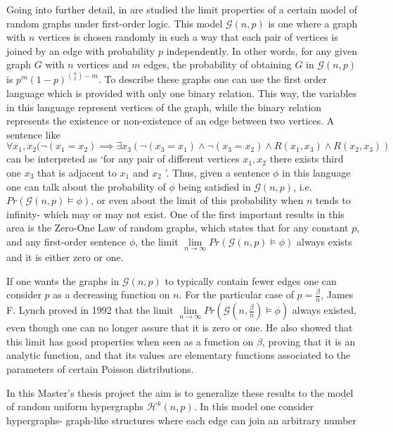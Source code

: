 \documentclass{article}
\begin{document}
Going into further detail, in \cite{lynch1992probabilities} are studied the limit properties of a certain model
of random graphs under first-order logic. This model $\mathcal{G}(n,p)$ is one where a graph with $n$ vertices is chosen
randomly in such a way that each pair of vertices is joined by an edge with probability $p$ independently. In other 
words, for any given graph $G$ with $n$ vertices and $m$ edges, the probability of obtaining $G$ in $\mathcal{G}(n,p)$
is $p^m(1-p)^{\binom{n}{2} - m}$. To describe these graphs one can use the first order language which is provided with 
only one binary relation. This way, the variables in this language represent vertices of the graph, while the binary relation 
represents the existence or non-existence of an edge between two vertices. A sentence like $\forall x_1, x_2 (\lnot(x_1=x_2)\implies \exists x_3 (\lnot(x_3=x_1) \wedge \lnot(x_3=x_2)\wedge R(x_1,x_3) \wedge R(x_2,x_3))$ can be interpreted as `for any pair of different vertices $x_1, x_2$ there exists third one $x_3$ that is adjacent to $x_1$ and $x_2$ '. Thus, given a sentence  $\phi$ in this language one can talk about the probability of $\phi$ being satisfied in $\mathcal{G}(n,p)$, i.e. $Pr(\mathcal{G}(n,p) \models \phi)$, or even about the limit of this probability when $n$ tends to infinity- which may or may not exist. 
One of the first important results in this area is the Zero-One Law of random graphs, which states that for any constant $p$, and any
first-order sentence $\phi$, the limit $\lim\limits_{n\rightarrow \infty} Pr(\mathcal{G}(n,p) \models \phi)$ always exists
and it is either zero or one. \par
If one wants the graphs in $\mathcal{G}(n,p)$ to typically contain fewer edges one can consider $p$ as a decreasing function
on $n$. For the particular case of $p=\frac{\beta}{n}$, James F. Lynch proved in 1992 \cite{lynch1992probabilities} that the limit $\lim\limits_{n\rightarrow \infty} Pr(\mathcal{G}(n,\frac{\beta}{n}) \models \phi)$ always existed, even though one can no longer assure that it is zero or one. He also showed that this limit has good properties when seen as a function on $\beta$, proving that it is an analytic function, and that its values are elementary functions associated to the parameters of certain Poisson distributions. \par
In this Master's thesis project the aim is to generalize these results to the model of random uniform hypergraphs 
$\mathcal{H}^k(n,p)$. In this model one consider hypergraphs- graph-like structures where each edge can join an arbitrary number 
\end{document}
